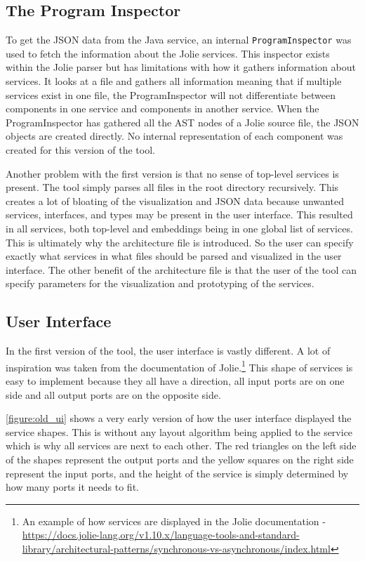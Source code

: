 \subsection{The Program Inspector}
To get the JSON data from the Java service, an internal \texttt{ProgramInspector} was used to fetch the information about the Jolie services. This inspector exists within the Jolie parser but has limitations with how it gathers information about services.
It looks at a file and gathers all information meaning that if multiple services exist in one file, the ProgramInspector will not differentiate between components in one service and components in another service.
When the ProgramInspector has gathered all the AST nodes of a Jolie source file, the JSON objects are created directly. No internal representation of each component was created for this version of the tool.

Another problem with the first version is that no sense of top-level services is present. The tool simply parses all files in the root directory recursively. This creates a lot of bloating of the visualization and JSON data because unwanted services, interfaces, and types may be present in the user interface.
This resulted in all services, both top-level and embeddings being in one global list of services.
This is ultimately why the architecture file is introduced. So the user can specify exactly what services in what files should be parsed and visualized in the user interface. The other benefit of the architecture file is that the user of the tool can specify parameters for the visualization and prototyping of the services.

\subsection{User Interface}
In the first version of the tool, the user interface is vastly different. A lot of inspiration was taken from the documentation of Jolie.\footnote{An example of how services are displayed in the Jolie documentation - \url{https://docs.jolie-lang.org/v1.10.x/language-tools-and-standard-library/architectural-patterns/synchronous-vs-asynchronous/index.html}}
This shape of services is easy to implement because they all have a direction, all input ports are on one side and all output ports are on the opposite side.

\cref{figure:old_ui} shows a very early version of how the user interface displayed the service shapes. This is without any layout algorithm being applied to the service which is why all services are next to each other.
The red triangles on the left side of the shapes represent the output ports and the yellow squares on the right side represent the input ports, and the height of the service is simply determined by how many ports it needs to fit.

